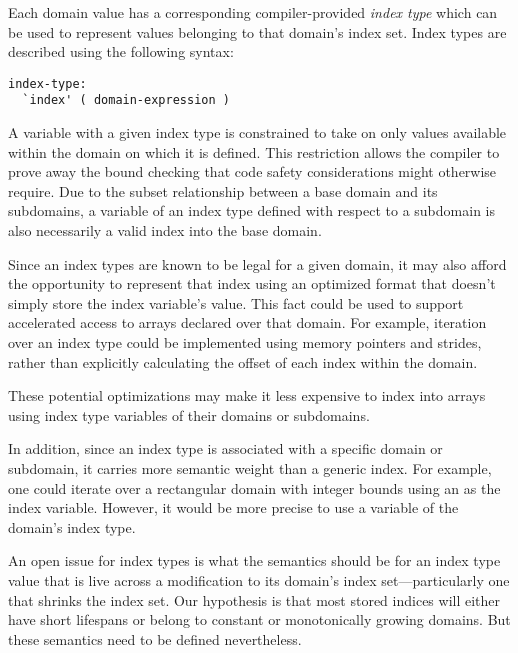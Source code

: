 Each domain value has a corresponding compiler-provided \emph{index
type} which can be used to represent values belonging to that domain's
index set.  Index types are described using the following syntax:

\begin{syntax}
\begin{verbatim}
index-type:
  `index' ( domain-expression )
\end{verbatim}
\end{syntax}

A variable with a given index type is constrained to take on only values
available within the domain on which it is defined.  This restriction allows the
compiler to prove away the bound checking that code safety considerations might
otherwise require.  Due to the subset relationship between a base domain and its
subdomains, a variable of an index type defined with respect to a subdomain is
also necessarily a valid index into the base domain.

Since an index types are known to be legal for a given domain, it may
also afford the opportunity to represent that index using an optimized
format that doesn't simply store the index variable's value.  This fact could be
used to support accelerated access to arrays declared over that domain.  For
example, iteration over an index type could be implemented using memory pointers
and strides, rather than explicitly calculating the offset of each index
within the domain.

These potential optimizations may make it less expensive to
index into arrays using index type variables of their domains or
subdomains.

In addition, since an index type is associated with a specific domain or subdomain, it
carries more semantic weight than a generic index.  For example, one could
iterate over a rectangular domain with integer bounds using an  as
the index variable.  However, it would be more precise to use a variable of the
domain's index type.

\begin{openissue}

An open issue for index types is what the semantics should be for an
index type value that is live across a modification to its domain's
index set---particularly one that shrinks the index set.  Our
hypothesis is that most stored indices will either have short
lifespans or belong to constant or monotonically growing domains.  But
these semantics need to be defined nevertheless.

\end{openissue}

